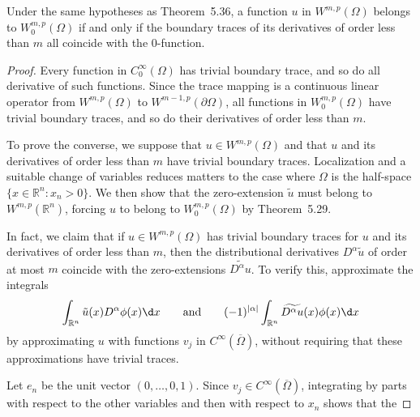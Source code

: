 \begin{theorem}
  Under the same hypotheses as Theorem~5.36, a function $u$ in $W^{m,p}(\Omega)$
  belongs to $W_0^{m,p}(\Omega)$ if and only if the boundary traces
  of its derivatives of order less than $m$ all coincide with the 0-function.
\end{theorem}

\begin{proof}
  Every function in $C_0^\infty(\Omega)$ has trivial boundary trace,
  and so do all derivative of such functions. Since the trace mapping
  is a continuous linear operator from $W^{m,p}(\Omega)$ to
  $W^{m-1,p}(\partial\Omega)$, all functions in $W^{m,p}_0(\Omega)$
  have trivial boundary traces, and so do their derivatives of order
  less than $m$.

  To prove the converse, we suppose that $u\in W^{m,p}(\Omega)$
  and that $u$ and its derivatives of order less than $m$ have trivial
  boundary traces. Localization and a suitable change of variables
  reduces matters to the case where $\Omega$ is the half-space
  $\{x\in\mathbb{R}^n : x_n>0\}$. We then show that the zero-extension
  $\tilde{u}$ must belong to $W^{m,p}(\mathbb{R}^n)$, forcing $u$
  to belong to $W_0^{m,p}(\Omega)$ by Theorem~5.29.

  In fact, we claim that if $u\in W^{m,p}(\Omega)$ has trivial
  boundary traces for $u$ and its derivatives of order less than $m$,
  then the distributional derivatives $D^\alpha \tilde{u}$
  of order at most $m$ coincide with the zero-extensions
  $\widetilde{D^\alpha u}$. To verify this, approximate the integrals
  \begin{equation}\label{eq:5.29}
    \int_{\mathbb{R}^n} \tilde{u}(x) D^\alpha \phi(x) \d x
    \qquad \text{and} \qquad
    (-1)^{|\alpha|} \int_{\mathbb{R}^n} \widetilde{D^\alpha u} (x) \phi(x) \d x
  \end{equation}
  by approximating $u$ with functions $v_j$ in $C^\infty(\overline{\Omega})$,
  without requiring that these approximations have trivial traces.

  Let $e_n$ be the unit vector $(0,\ldots,0,1)$. Since $v_j\in C^\infty(\overline{\Omega})$,
  integrating by parts with respect to the other variables and then
  with respect to $x_n$ shows that the
\end{proof}